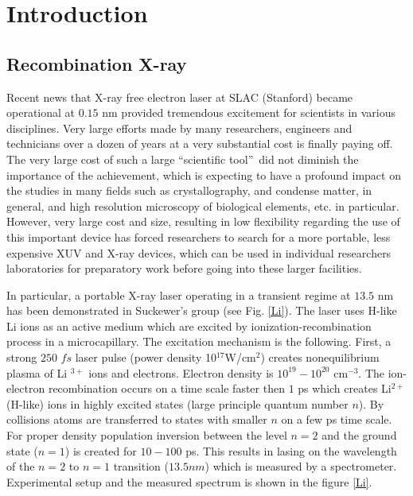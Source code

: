 \chapter{Introduction\label{ch:intro}}

\section{Recombination X-ray}
Recent news that X-ray free electron laser at SLAC (Stanford) became
operational at $0.15$ nm provided tremendous excitement for scientists in
various disciplines. Very large efforts made by many researchers, engineers
and technicians over a dozen of years at a very substantial cost is finally
paying off. The very large cost of such a large \textquotedblleft scientific
tool\textquotedblright\ did not diminish the importance of the achievement,
which is expecting to have a profound impact on the studies in many fields
such as crystallography, and condense matter, in general, and high
resolution microscopy of biological elements, etc. in particular. However,
very large cost and size, resulting in low flexibility regarding the use of
this important device has forced researchers to search for a more portable,
less expensive XUV and X-ray devices, which can be used in individual
researchers laboratories for preparatory work before going into these larger
facilities.

In particular, a portable X-ray laser operating in a transient regime at $%
13.5$ nm has been demonstrated in Suckewer's group \cite{Koro96} (see Fig. %
\ref{Li}). The laser uses H-like Li ions as an active medium which are
excited by ionization-recombination process in a microcapillary. The
excitation mechanism is the following. First, a strong $250$ $fs$ laser
pulse (power density 10$^{17}$W/cm$^{2}$) creates nonequilibrium plasma of Li%
$^{3+}$ ions and electrons. Electron density is $10^{19}-10^{20}$ cm$^{-3}$.
The ion-electron recombination occurs on a time scale faster then $1$ ps
which creates Li$^{2+}$ (H-like) ions in highly excited states (large
principle quantum number $n$). By collisions atoms are transferred to states
with smaller $n$ on a few ps time scale. For proper density population
inversion between the level $n=2$ and the ground state ($n=1$) is created
for $10-100$ ps. This results in lasing on the wavelength of the $n=2$ to $%
n=1$ transition ($13.5nm$) which is measured by a spectrometer. Experimental
setup and the measured spectrum is shown in the figure \ref{Li}.

